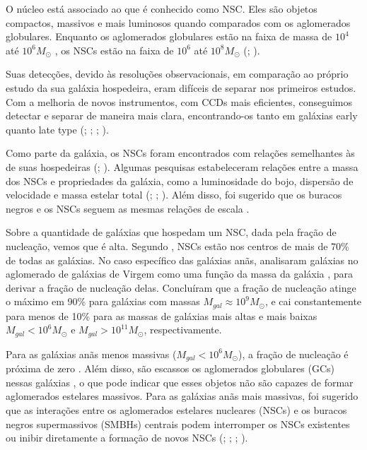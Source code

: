O núcleo está associado ao que é conhecido como \ac{NSC}. Eles são objetos compactos, massivos e mais luminosos quando comparados com os aglomerados globulares. Enquanto os aglomerados globulares estão na faixa de massa de $10^4$ até $10^6 M_{\odot}$ \citep{Masters_2010}, os NSCs estão na faixa de $10^6$ até $10^8 M_{\odot}$ (\citealp{Spengler_2017}; \citealp{Georgiev_2016}).

Suas detecções, devido às resoluções observacionais, em comparação ao próprio estudo da sua galáxia hospedeira, eram difíceis de separar nos primeiros estudos. Com a melhoria de novos instrumentos, com CCDs mais eficientes, conseguimos detectar e separar de maneira mais clara, encontrando-os tanto em galáxias early quanto late type (\citealp{Phillips_1996}; \citealp{Carollo_1997}; \citealp{Matthews_1999}; \citealp{boker_2002}).

Como parte da galáxia, os NSCs foram encontrados com relações semelhantes às de suas hospedeiras (\citealp{Balcells_2003}; \citealp{Graham_2003}). Algumas pesquisas estabeleceram relações entre a massa dos NSCs e propriedades da galáxia, como a luminosidade do bojo, dispersão de velocidade e massa estelar total (\citep{Ferrarese_2006};  \citep{Wehner_2006};  \citep{Rossa_2006}). Além disso, foi sugerido que os buracos negros e os NSCs seguem as mesmas relações de escala \citep{Ferrarese_2006}.

Sobre a quantidade de galáxias que hospedam um NSC, dada pela fração de nucleação, vemos que é alta. Segundo \cite{Boker_2010}, NSCs estão nos centros de mais de 70\% de todas as galáxias. No caso específico das galáxias anãs, analisaram galáxias no aglomerado de galáxias de Virgem como uma função da massa da galáxia \citep{Sanchez_2019}, para derivar a fração de nucleação delas. Concluíram que a fração de nucleação atinge o máximo em 90\% para galáxias com massas $M_{gal} \approx 10^9 M_{\odot}$, e cai constantemente para menos de 10\% para as massas de galáxias mais altas e mais baixas $M_{gal} < 10^6 M_{\odot}$ e $M_{gal} > 10^{11} M_{\odot}$, respectivamente.

Para as galáxias anãs menos massivas ($M_{gal} < 10^6 M_{\odot}$), a fração de nucleação é próxima de zero \citep{Ordenes_2018}. Além disso, são escassos os aglomerados globulares (GCs) nessas galáxias \citep{Forbes_2018}, o que pode indicar que esses objetos não são capazes de formar aglomerados estelares massivos. Para as galáxias anãs mais massivas, foi sugerido que as interações entre os aglomerados estelares nucleares (NSCs) e os buracos negros supermassivos (SMBHs) centrais podem interromper os NSCs existentes ou inibir diretamente a formação de novos NSCs (\citealp{Cote_2006}; \citealp{Neumayer_2012}; \citealp{Antonini_2015}; \citealp{Arca_2016}).

